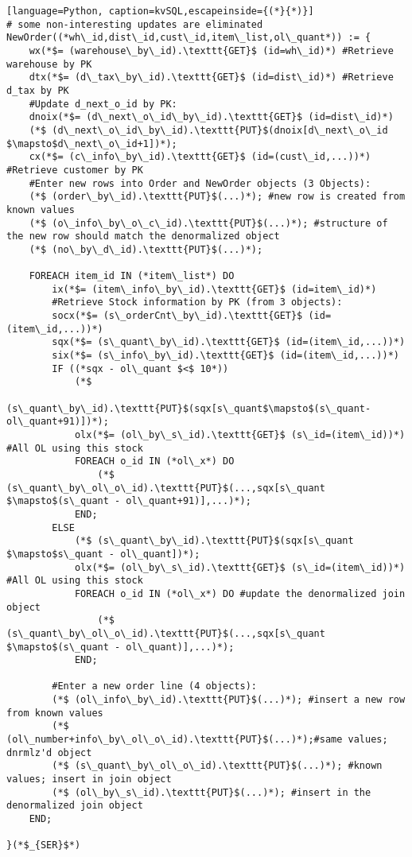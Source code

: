 \lstset{style=kvSQLstyle}
\begin{lstlisting}[language=Python, caption=kvSQL,escapeinside={(*}{*)}]
# some non-interesting updates are eliminated
NewOrder((*wh\_id,dist\_id,cust\_id,item\_list,ol\_quant*)) := {	
	wx(*$= (warehouse\_by\_id).\texttt{GET}$ (id=wh\_id)*) #Retrieve warehouse by PK
	dtx(*$= (d\_tax\_by\_id).\texttt{GET}$ (id=dist\_id)*) #Retrieve d_tax by PK
	#Update d_next_o_id by PK:
	dnoix(*$= (d\_next\_o\_id\_by\_id).\texttt{GET}$ (id=dist\_id)*) 
	(*$ (d\_next\_o\_id\_by\_id).\texttt{PUT}$(dnoix[d\_next\_o\_id $\mapsto$d\_next\_o\_id+1])*);
	cx(*$= (c\_info\_by\_id).\texttt{GET}$ (id=(cust\_id,...))*) #Retrieve customer by PK
	#Enter new rows into Order and NewOrder objects (3 Objects):
	(*$ (order\_by\_id).\texttt{PUT}$(...)*); #new row is created from known values
	(*$ (o\_info\_by\_o\_c\_id).\texttt{PUT}$(...)*); #structure of the new row should match the denormalized object
	(*$ (no\_by\_d\_id).\texttt{PUT}$(...)*);
	
	FOREACH item_id IN (*item\_list*) DO
		ix(*$= (item\_info\_by\_id).\texttt{GET}$ (id=item\_id)*)
		#Retrieve Stock information by PK (from 3 objects):
		socx(*$= (s\_orderCnt\_by\_id).\texttt{GET}$ (id=(item\_id,...))*)
		sqx(*$= (s\_quant\_by\_id).\texttt{GET}$ (id=(item\_id,...))*)
		six(*$= (s\_info\_by\_id).\texttt{GET}$ (id=(item\_id,...))*)
		IF ((*sqx - ol\_quant $<$ 10*))
			(*$
			(s\_quant\_by\_id).\texttt{PUT}$(sqx[s\_quant$\mapsto$(s\_quant-ol\_quant+91)])*);		
			olx(*$= (ol\_by\_s\_id).\texttt{GET}$ (s\_id=(item\_id))*) #All OL using this stock
			FOREACH o_id IN (*ol\_x*) DO
				(*$ (s\_quant\_by\_ol\_o\_id).\texttt{PUT}$(...,sqx[s\_quant $\mapsto$(s\_quant - ol\_quant+91)],...)*);
			END;
		ELSE
			(*$ (s\_quant\_by\_id).\texttt{PUT}$(sqx[s\_quant $\mapsto$s\_quant - ol\_quant])*);		
			olx(*$= (ol\_by\_s\_id).\texttt{GET}$ (s\_id=(item\_id))*) #All OL using this stock
			FOREACH o_id IN (*ol\_x*) DO #update the denormalized join object
				(*$ (s\_quant\_by\_ol\_o\_id).\texttt{PUT}$(...,sqx[s\_quant $\mapsto$(s\_quant - ol\_quant)],...)*);
			END;
	
		#Enter a new order line (4 objects):
		(*$ (ol\_info\_by\_id).\texttt{PUT}$(...)*); #insert a new row from known values
		(*$ (ol\_number+info\_by\_ol\_o\_id).\texttt{PUT}$(...)*);#same values; dnrmlz'd object
		(*$ (s\_quant\_by\_ol\_o\_id).\texttt{PUT}$(...)*); #known values; insert in join object
		(*$ (ol\_by\_s\_id).\texttt{PUT}$(...)*); #insert in the denormalized join object
	END;

}(*$_{SER}$*)
\end{lstlisting}
\vspace{14mm}



